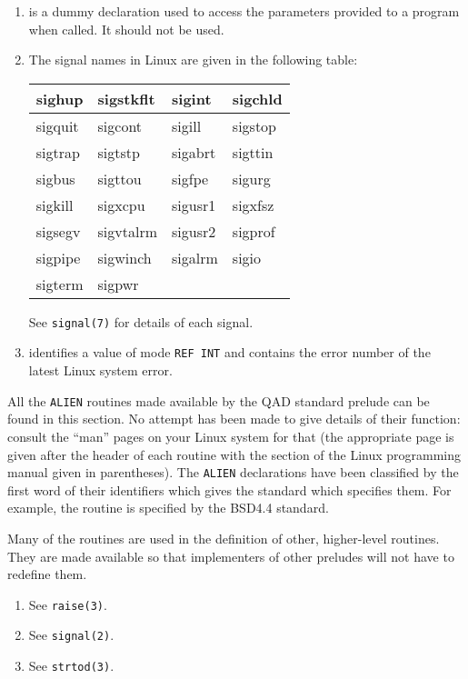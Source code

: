 \begin{enumerate}
\item {} is a dummy declaration used to access the
parameters provided to a program when called. It should not be used.
\item The signal names in Linux are given in the following table:
\begin{center}
\begin{tabular}{|l|l|l|l|}
\hline
sighup  & sigstkflt & sigint  & sigchld \\ \hline
sigquit & sigcont   & sigill  & sigstop \\ \hline
sigtrap & sigtstp   & sigabrt & sigttin \\ \hline
sigbus  & sigttou   & sigfpe  & sigurg  \\ \hline
sigkill & sigxcpu   & sigusr1 & sigxfsz \\ \hline
sigsegv & sigvtalrm & sigusr2 & sigprof \\ \hline
sigpipe & sigwinch  & sigalrm & sigio   \\ \hline
sigterm & sigpwr    &         &         \\ \hline
\end{tabular}
\end{center}
See \verb|signal(7)| for details of each signal.
\item {} identifies a value of mode \verb|REF INT| and
contains the error number of the latest Linux system error.
\end{enumerate}

All the \verb|ALIEN| routines made available by the QAD standard
prelude can be found in this section. No attempt has been made to
give details of their function: consult the ``man'' pages on your
Linux system for that (the appropriate page is given after the header
of each routine with the section of the Linux programming manual
given in parentheses). The \verb|ALIEN| declarations have been
classified by the first word of their identifiers which gives the
standard which specifies them. For example, the routine  is specified by the BSD4.4 standard.

Many of the routines are used in the definition of other,
higher-level routines. They are made available so that implementers
of other preludes will not have to redefine them.

\begin{enumerate}
\item {}\newline
See \verb|raise(3)|.
\item {}\newline
See \verb|signal(2)|.
\item {}\newline
See \verb|strtod(3)|.
\end{enumerate}

